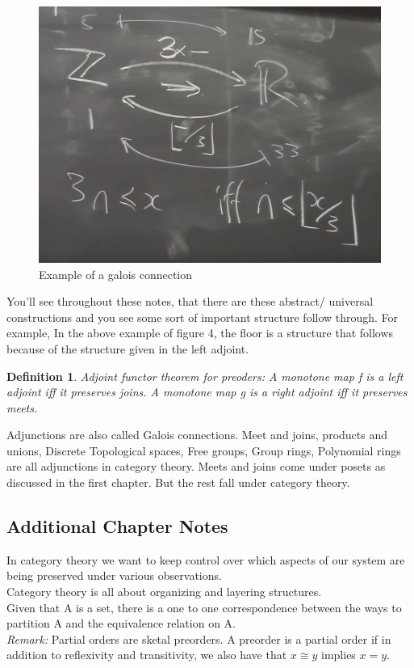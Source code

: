 \documentclass{article}
\newtheorem{defn}[thm]{Definition} %
\begin{document}
\begin{figure}[h!]
    \centering
    \includegraphics[scale=0.5]{./images/4.jpg} 
    \caption{Example of a galois connection}
    \label{fig:my_label} 
\end{figure}
 
 You'll see throughout these notes, that there are these abstract/ universal constructions and you see some sort of important structure follow through. For example, In the above example of figure 4, the floor is a structure that follows because of the structure given in the left adjoint. 
 
 \begin{defn}
 Adjoint functor theorem for preoders: A monotone map f is a left adjoint iff it preserves joins. A monotone map g is a right adjoint iff it preserves meets. 
 \end{defn}

Adjunctions are also called Galois connections. Meet and joins, products and unions, Discrete Topological spaces, 
Free groups, Group rings, Polynomial rings are all adjunctions in category theory. Meets and joins come under posets
as discussed in the first chapter. But the rest fall under category theory. 

\subsection{Additional Chapter Notes}
In category theory we want to keep control over which aspects of our system are being preserved under various observations. \\
Category theory is all about organizing and layering structures. \\
Given that A is a set, there is a one to one correspondence between the ways to partition A and the equivalence relation on A. \\
\emph{Remark:} Partial orders are sketal preorders. A preorder is a partial order if in addition to reflexivity and transitivity, we also have that $x \cong y$ implies $x = y$. \\
\end{document}
